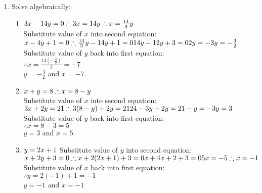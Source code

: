  \begin{solutions}{}{
\begin{enumerate}[itemsep=10pt, label=\textbf{\arabic*}. ] 
\item Solve algebraically: 
\begin{enumerate}[itemsep=5pt, label=\textbf{(\alph*)} ] 
\item $3x-14y=0\\\therefore 3x=14y\\ \therefore x=\frac{14}{3}y$\\
 Substitute value of $x$ into second equation: \\
$x-4y+1=0\\ \therefore \frac{14}{3}y-14y+1=0\\ 14y-12y+3=0\\2y=-3\\y=-\frac{3}{2}$\\ 
Substitute value of $y$ back into first equation:\\
$\therefore x=\frac{14 (-\frac{3}{2})}{3} = -7$\\
$y=-\frac{3}{2}$ and $x=-7$.

\item $x+y=8 \\ \therefore x=8-y$\\
Substitute value of $x$ into second equation:\\
$3x+2y=21 \\ \therefore 3(8-y)+2y = 21\\ 24-3y+2y=21\\ -y=-3\\y=3\\ $
Substitute value of $y$ back into first equation:\\
$\therefore x=8-3=5$\\
$y=3$ and $x=5$

\item $y=2x+1 \\ $
Substitute value of $y$ into second equation:\\
$ x+2y+3=0\\ \therefore x+2(2x+1)+3=0\\ 
x+4x+2+3=0\\
5x=-5\\
\therefore x=-1$\\ 
Substitute value of $x$ back into first equation:\\
$\therefore y=2(-1)+1=-1$\\
$y=-1$ and $x=-1$


\end{enumerate}
\end{enumerate}}
\end{solutions}
